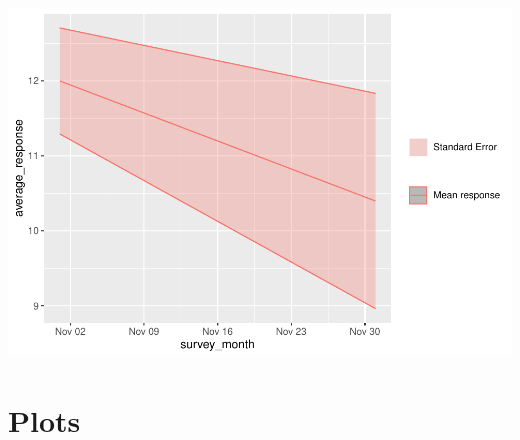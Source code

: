 \documentclass[
  10pt,
]{article}
\begin{document}
\includegraphics{../pdf/Report_files/figure-latex/monthly trend-1.pdf}

\hypertarget{plots}{%
\section{Plots}\label{plots}}
\end{document}
